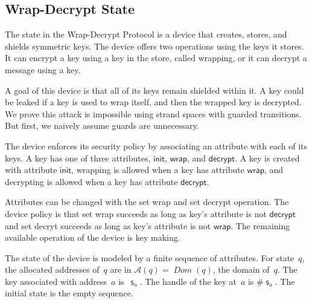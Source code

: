 \documentclass[12pt]{article}
\newcommand{\cn}[1]{\ensuremath{\operatorname{\mathsf{#1}}}}
\newcommand{\fn}[1]{\ensuremath{\operatorname{\mathit{#1}}}}
\newcommand{\dom}{\fn{Dom}}
\newcommand{\addr}{\ensuremath{\mathcal{A}}}
\newcommand{\ainit}{\ensuremath{\mathsf{init}}}
\newcommand{\awrap}{\ensuremath{\mathsf{wrap}}}
\newcommand{\adecrypt}{\ensuremath{\mathsf{decrypt}}}
\begin{document}
\subsection{Wrap-Decrypt State}\label{sec:wrap-decryt state}

The state in the Wrap-Decrypt Protocol is a device that creates,
stores, and shields symmetric keys.  The device offers two operations
using the keys it stores.  It can encrypt a key using a key in the
store, called wrapping, or it can decrypt a message using a key.

A goal of this device is that all of its keys remain shielded within
it.  A key could be leaked if a key is used to wrap itself, and then
the wrapped key is decrypted.  We prove this attack is impossible
using strand spaces with guarded transitions.  But first, we naively
assume guards are unnecessary.

The device enforces its security policy by associating an attribute
with each of its keys.  A key has one of three attributes, \ainit,
\awrap, and \adecrypt.  A key is created with attribute \ainit,
wrapping is allowed when a key has attribute \awrap, and decrypting
is allowed when a key has attribute \adecrypt.

Attributes can be changed with the set wrap and set decrypt operation.
The device policy is that set wrap succeeds as long as key's attribute
is not {\adecrypt} and set decryt succeeds as long as key's attribute
is not \awrap.  The remaining available operation of the device is
key making.

The state of the device is modeled by a finite sequence of attributes.
For state~$q$, the allocated addresses of~$q$ are in
$\addr(q)=\dom(q)$, the domain of~$q$.  The key associated with
address~$a$ is~$\cn{s}_a$.  The handle of the key at~$a$ is
$\#\cn{s}_a$.  The initial state is the empty sequence.

\end{document}
